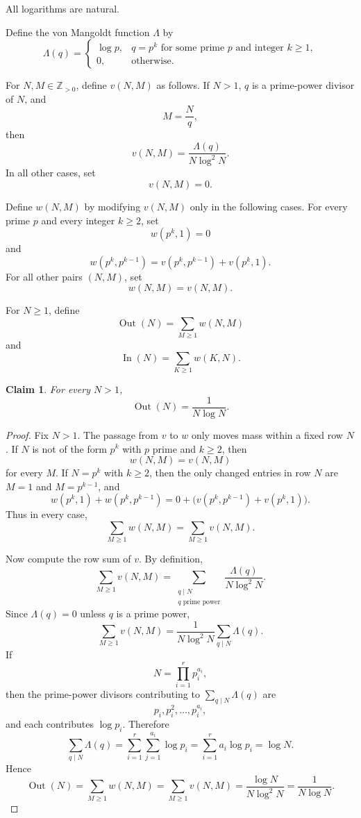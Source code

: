 \documentclass{amsart}
\newtheorem{claim}{Claim}
\begin{document}
All logarithms are natural.

Define the von Mangoldt function \(\Lambda\) by
\[
\Lambda(q)=
\begin{cases}
\log p, & q=p^k \text{ for some prime } p \text{ and integer } k\geq 1,\\
0, & \text{otherwise.}
\end{cases}
\]

For \(N,M\in\mathbb Z_{>0}\), define \(v(N,M)\) as follows.  If \(N>1\), \(q\) is a prime-power divisor of \(N\), and
\[
M=\frac{N}{q},
\]
then
\[
v(N,M)=\frac{\Lambda(q)}{N\log^2 N}.
\]
In all other cases, set
\[
v(N,M)=0.
\]

Define \(w(N,M)\) by modifying \(v(N,M)\) only in the following cases.  For every prime \(p\) and every integer \(k\geq 2\), set
\[
w(p^k,1)=0
\]
and
\[
w(p^k,p^{k-1})
=
v(p^k,p^{k-1})+v(p^k,1).
\]
For all other pairs \((N,M)\), set
\[
w(N,M)=v(N,M).
\]

For \(N\geq 1\), define
\[
\operatorname{Out}(N)=\sum_{M\geq 1} w(N,M)
\]
and
\[
\operatorname{In}(N)=\sum_{K\geq 1} w(K,N).
\]

\begin{claim}
For every \(N>1\),
\[
\operatorname{Out}(N)=\frac{1}{N\log N}.
\]
\end{claim}

\begin{proof}
Fix \(N>1\).  The passage from \(v\) to \(w\) only moves mass within a fixed row \(N\).  If \(N\) is not of the form \(p^k\) with \(p\) prime and \(k\geq 2\), then
\[
w(N,M)=v(N,M)
\]
for every \(M\).  If \(N=p^k\) with \(k\geq 2\), then the only changed entries in row \(N\) are \(M=1\) and \(M=p^{k-1}\), and
\[
w(p^k,1)+w(p^k,p^{k-1})
=
0+\bigl(v(p^k,p^{k-1})+v(p^k,1)\bigr).
\]
Thus in every case,
\[
\sum_{M\geq 1}w(N,M)=\sum_{M\geq 1}v(N,M).
\]

Now compute the row sum of \(v\).  By definition,
\[
\sum_{M\geq 1}v(N,M)
=
\sum_{\substack{q\mid N\\ q\text{ prime power}}}
\frac{\Lambda(q)}{N\log^2 N}.
\]
Since \(\Lambda(q)=0\) unless \(q\) is a prime power,
\[
\sum_{M\geq 1}v(N,M)
=
\frac{1}{N\log^2 N}\sum_{q\mid N}\Lambda(q).
\]
If
\[
N=\prod_{i=1}^r p_i^{a_i},
\]
then the prime-power divisors contributing to \(\sum_{q\mid N}\Lambda(q)\) are
\[
p_i,p_i^2,\dots,p_i^{a_i},
\]
and each contributes \(\log p_i\).  Therefore
\[
\sum_{q\mid N}\Lambda(q)
=
\sum_{i=1}^r\sum_{j=1}^{a_i}\log p_i
=
\sum_{i=1}^r a_i\log p_i
=
\log N.
\]
Hence
\[
\operatorname{Out}(N)
=
\sum_{M\geq 1}w(N,M)
=
\sum_{M\geq 1}v(N,M)
=
\frac{\log N}{N\log^2 N}
=
\frac{1}{N\log N}.
\]
\end{proof}
\end{document}
